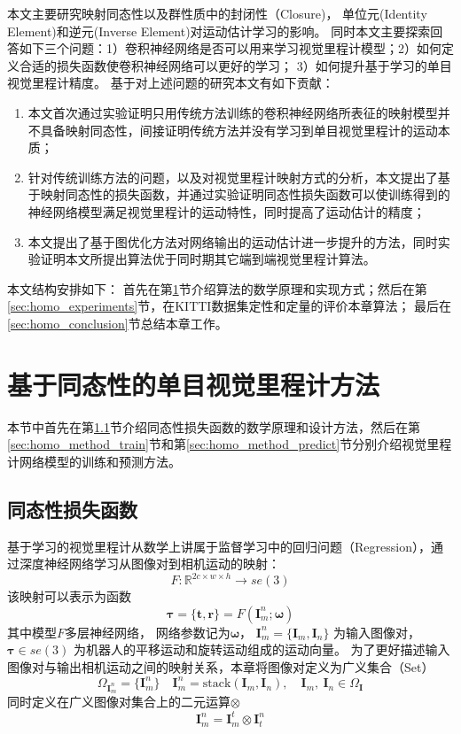 本文主要研究映射同态性以及群性质中的封闭性（Closure)，
单位元(Identity Element)和逆元(Inverse Element)对运动估计学习的影响。
同时本文主要探索回答如下三个问题：1）卷积神经网络是否可以用来学习视觉里程计模型；2）如何定义合适的损失函数使卷积神经网络可以更好的学习；
3）如何提升基于学习的单目视觉里程计精度。
基于对上述问题的研究本文有如下贡献：
\begin{enumerate}
    \item 本文首次通过实验证明只用传统方法训练的卷积神经网络所表征的映射模型并不具备映射同态性，间接证明传统方法并没有学习到单目视觉里程计的运动本质；
    \item 针对传统训练方法的问题，以及对视觉里程计映射方式的分析，本文提出了基于映射同态性的损失函数，并通过实验证明同态性损失函数可以使训练得到的神经网络模型满足视觉里程计的运动特性，同时提高了运动估计的精度；
    \item 本文提出了基于图优化方法对网络输出的运动估计进一步提升的方法，同时实验证明本文所提出算法优于同时期其它端到端视觉里程计算法。
\end{enumerate}

本文结构安排如下：
首先在第\ref{sec:homo_approach}节介绍算法的数学原理和实现方式；然后在第\ref{sec:homo_experiments}节，在KITTI数据集\cite{geiger2012kitti}定性和定量的评价本章算法；
最后在\ref{sec:homo_conclusion}节总结本章工作。

\section{基于同态性的单目视觉里程计方法}
\label{sec:homo_approach}
本节中首先在第\ref{sec:homo_method_loss}节介绍同态性损失函数的数学原理和设计方法，然后在第\ref{sec:homo_method_train}节和第\ref{sec:homo_method_predict}节分别介绍视觉里程计网络模型的训练和预测方法。
\subsection{同态性损失函数}
\label{sec:homo_method_loss}
基于学习的视觉里程计从数学上讲属于监督学习中的回归问题（Regression），通过深度神经网络学习从图像对到相机运动的映射：
\begin{equation}
    F: \mathbb{R}^{2c\times w\times h} \to se(3)
\end{equation}
该映射可以表示为函数
\begin{equation}
    \mathbf{\tau} = \{\mathbf{t},\mathbf{r}\}= F(\mathbf{I}_m^n;\mathbf{\omega})
    \label{eq:objective}
\end{equation}
其中模型$F$多层神经网络， 网络参数记为$\mathbf{\omega}$， $\mathbf{I}_m^n =\{\mathbf{I}_m,\mathbf{I}_n\}$ 为输入图像对，
$\mathbf{\tau}\in se(3)$ 为机器人的平移运动和旋转运动组成的运动向量。
为了更好描述输入图像对与输出相机运动之间的映射关系，本章将图像对定义为广义集合（Set）
\begin{equation}
   \Omega_{\mathbf{I}_m^n} = \{\mathbf{I}_m^n\} \quad \mathbf{I}_m^n=\text{stack}(\mathbf{I}_m,\mathbf{I}_n),\quad \mathbf{I}_m,\  \mathbf{I}_n \in \Omega_{\mathbf{I}}
\end{equation}
同时定义在广义图像对集合上的二元运算$\otimes$ 
\begin{equation}
    \mathbf{I}_m^n = \mathbf{I}_m^t \otimes\mathbf{I}_t^n
\end{equation}

